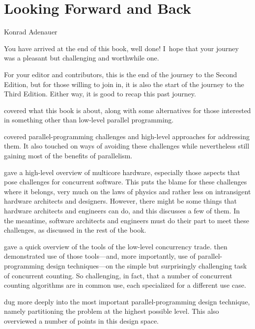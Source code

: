 
\chapter{Looking Forward and Back}
\label{chp:Looking Forward and Back}
%
	  {Konrad Adenauer}

You have arrived at the end of this book, well done!
I~hope that your journey was a pleasant but challenging and worthwhile
one.

For your editor and contributors, this is the end of the journey to the
Second Edition, but for those willing to join in, it is also the start
of the journey to the Third Edition.
Either way, it is good to recap this past journey.

 covered what this book is about, along
with some alternatives for those interested in something other than
low-level parallel programming.

 covered parallel-programming challenges and
high-level approaches for addressing them.
It also touched on ways of avoiding these challenges while nevertheless
still gaining most of the benefits of parallelism.

 gave a high-level overview of multicore
hardware, especially those aspects that pose challenges for concurrent
software.
This  puts the blame for these
challenges where it belongs, very much on the laws of physics and rather
less on intransigent hardware architects and designers.
However, there might be some things that hardware architects and engineers
can do, and this  discusses a few of
them.
In the meantime, software architects and engineers must do their part
to meet these challenges, as discussed in the rest of the book.

gave a quick overview of the tools of the low-level concurrency trade.
 then demonstrated use of those tools---and, more
importantly, use of parallel-programming design techniques---on the
simple but surprisingly challenging task of concurrent counting.
So challenging, in fact, that a number of concurrent counting algorithms
are in common use, each specialized for a different use case.

 dug more deeply
into the most important parallel-programming design technique, namely
partitioning the problem at the highest possible level.
This  also
overviewed a number of points in this design space.

